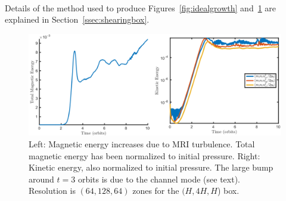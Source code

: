 \\
Details of the method used to produce Figures~\ref{fig:idealgrowth} and~\ref{fig:idealME} are explained in Section~\ref{ssec:shearingbox}.
\begin{figure}[h]
    \begin{center}
      \includegraphics [width=.9\textwidth, angle=0.]{img/ideal-R1L1_KEME.pdf}
    \end{center}
    \caption{Left: Magnetic energy increases due to MRI turbulence. Total magnetic energy has been normalized to initial pressure. Right: Kinetic energy, also normalized to initial pressure. The large bump around $t=3$ orbits is due to the channel mode (see text). Resolution is $(64,128,64)$ zones for the $(H,4H,H$) box.}
      \label{fig:idealME}
\end{figure}

